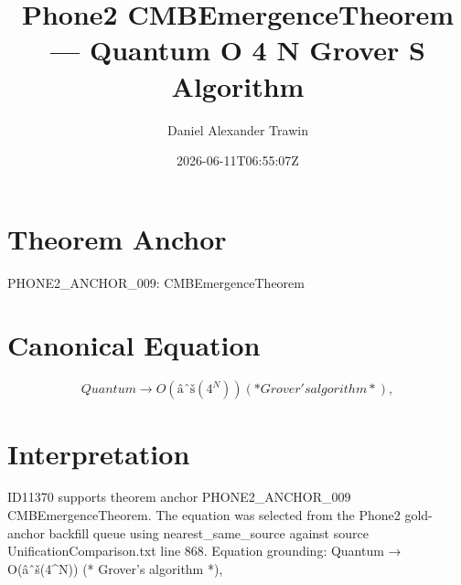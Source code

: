 \documentclass[11pt]{article}
\title{Phone2 CMBEmergenceTheorem — Quantum O 4 N Grover S Algorithm}
\author{Daniel Alexander Trawin}
\date{2026-06-11T06:55:07Z}
\begin{document}
\maketitle
\section*{Theorem Anchor}
PHONE2_ANCHOR_009: CMBEmergenceTheorem
\section*{Canonical Equation}
\[
Quantum → O(âˆš(4^N)) (* Grover's algorithm *),
\]
\section*{Interpretation}
ID11370 supports theorem anchor PHONE2_ANCHOR_009 CMBEmergenceTheorem. The equation was selected from the Phone2 gold-anchor backfill queue using nearest_same_source against source UnificationComparison.txt line 868. Equation grounding: Quantum → O(âˆš(4^N)) (* Grover's algorithm *),
\end{document}

